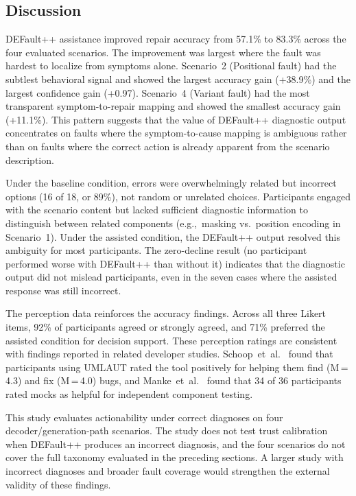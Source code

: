 
\subsection{Discussion}
\label{sec:defaultpp_devstudy_discussion}

DEFault++ assistance improved repair accuracy from 57.1\% to 83.3\% across the four evaluated scenarios. The improvement was largest where the fault was hardest to localize from symptoms alone. Scenario~2 (Positional fault) had the subtlest behavioral signal and showed the largest accuracy gain (+38.9\%) and the largest confidence gain (+0.97). Scenario~4 (Variant fault) had the most transparent symptom-to-repair mapping and showed the smallest accuracy gain (+11.1\%). This pattern suggests that the value of DEFault++ diagnostic output concentrates on faults where the symptom-to-cause mapping is ambiguous rather than on faults where the correct action is already apparent from the scenario description.

Under the baseline condition, errors were overwhelmingly related but incorrect options (16 of 18, or 89\%), not random or unrelated choices. Participants engaged with the scenario content but lacked sufficient diagnostic information to distinguish between related components (e.g.,~masking vs.\ position encoding in Scenario~1). Under the assisted condition, the DEFault++ output resolved this ambiguity for most participants. The zero-decline result (no participant performed worse with DEFault++ than without it) indicates that the diagnostic output did not mislead participants, even in the seven cases where the assisted response was still incorrect.

The perception data reinforces the accuracy findings. Across all three Likert items, 92\% of participants agreed or strongly agreed, and 71\% preferred the assisted condition for decision support. These perception ratings are consistent with findings reported in related developer studies. Schoop~et~al.~\cite{umlaut} found that participants using UMLAUT rated the tool positively for helping them find (M\,=\,4.3) and fix (M\,=\,4.0) bugs, and Manke~et~al.~\cite{kunit} found that 34 of 36 participants rated mocks as helpful for independent component testing.

This study evaluates actionability under correct diagnoses on four decoder/generation-path scenarios. The study does not test trust calibration when DEFault++ produces an incorrect diagnosis, and the four scenarios do not cover the full taxonomy evaluated in the preceding sections. A larger study with incorrect diagnoses and broader fault coverage would strengthen the external validity of these findings.

